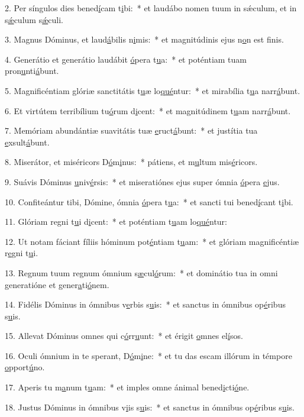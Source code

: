 2. Per síngulos dies bened\uline{í}cam t\uline{i}bi:~* et laudábo nomen tuum in sǽculum, et in s\uline{ǽ}culum s\uline{ǽ}culi.\par 
3. Magnus Dóminus, et laud\uline{á}bilis n\uline{i}mis:~* et magnitúdinis ejus n\uline{o}n est f\uline{i}nis.\par 
4. Generátio et generátio laudábit \uline{ó}pera t\uline{u}a:~* et poténtiam tuam pron\uline{u}nti\uline{á}bunt.\par 
5. Magnificéntiam glóriæ sanctitátis t\uline{u}æ lo\uline{qué}ntur:~* et mirabília t\uline{u}a narr\uline{á}bunt.\par 
6. Et virtútem terribílium tu\uline{ó}rum d\uline{i}cent:~* et magnitúdinem t\uline{u}am narr\uline{á}bunt.\par 
7. Memóriam abundántiæ suavitátis tuæ \uline{e}ruct\uline{á}bunt:~* et justítia tua \uline{e}xsult\uline{á}bunt.\par 
8. Miserátor, et miséricors D\uline{ó}m\uline{i}nus:~* pátiens, et m\uline{u}ltum mis\uline{é}ricors.\par 
9. Suávis Dóminus \uline{u}niv\uline{é}rsis:~* et miseratiónes ejus super ómnia \uline{ó}pera \uline{e}jus.\par 
10. Confiteántur tibi, Dómine, ómnia \uline{ó}pera t\uline{u}a:~* et sancti tui bened\uline{í}cant t\uline{i}bi.\par 
11. Glóriam regni t\uline{u}i d\uline{i}cent:~* et poténtiam t\uline{u}am lo\uline{qué}ntur:\par 
12. Ut notam fáciant fíliis hóminum pot\uline{é}ntiam t\uline{u}am:~* et glóriam magnificéntiæ r\uline{e}gni t\uline{u}i.\par 
13. Regnum tuum regnum ómnium s\uline{æ}cul\uline{ó}rum:~* et dominátio tua in omni generatióne et gener\uline{a}ti\uline{ó}nem.\par 
14. Fidélis Dóminus in ómnibus v\uline{e}rbis s\uline{u}is:~* et sanctus in ómnibus op\uline{é}ribus s\uline{u}is.\par 
15. Allevat Dóminus omnes qui c\uline{ó}rr\uline{u}unt:~* et érigit \uline{o}mnes el\uline{í}sos.\par 
16. Oculi ómnium in te sperant, D\uline{ó}m\uline{i}ne:~* et tu das escam illórum in témpore \uline{o}pport\uline{ú}no.\par 
17. Aperis tu m\uline{a}num t\uline{u}am:~* et imples omne ánimal bened\uline{i}cti\uline{ó}ne.\par 
18. Justus Dóminus in ómnibus v\uline{i}is s\uline{u}is:~* et sanctus in ómnibus op\uline{é}ribus s\uline{u}is.\par 
